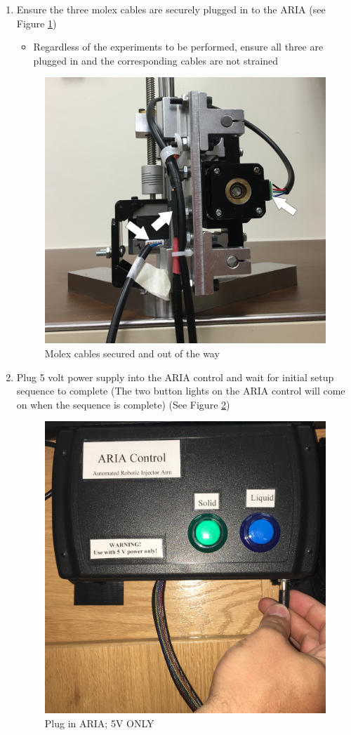 \documentclass[letterpaper,11pt]{article}
\begin{document}
\begin{enumerate}
    \item Ensure the three molex cables are securely plugged in to the ARIA 
        (see Figure \ref{fig:Molex_cables})
        \begin{itemize}
        \item Regardless of the experiments to be performed, ensure all three 
            are plugged in and the corresponding cables are not strained
        \end{itemize}
        
\begin{figure}[H]
\centering\includegraphics[width=.5\textwidth]{Molex_cables.jpg}
\caption{Molex cables secured and out of the way}
\label{fig:Molex_cables}
\end{figure}
    

    \item Plug 5 volt power supply into the ARIA control and wait for 
        initial setup sequence to complete (The two button lights on the ARIA
        control will come on when the sequence is complete) 
        (See Figure \ref{fig:5V_cable})
        
\begin{figure}[H]
\centering\includegraphics[width=.5\textwidth]{5V_cable.jpg}
\caption{Plug in ARIA; 5V ONLY}
\label{fig:5V_cable}
\end{figure}


\end{enumerate}
\end{document}
